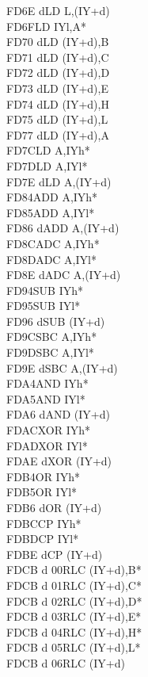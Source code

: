 \documentclass[oneside,a4paper]{book}
\begin{document}
\begin{multicols}{3}
{\begin{tabbing}
FD6E d\>LD L,(IY+d)\\
FD6F\>LD IYl,A*\\
FD70 d\>LD (IY+d),B\\
FD71 d\>LD (IY+d),C\\
FD72 d\>LD (IY+d),D\\
FD73 d\>LD (IY+d),E\\
FD74 d\>LD (IY+d),H\\
FD75 d\>LD (IY+d),L\\
FD77 d\>LD (IY+d),A\\
FD7C\>LD A,IYh*\\
FD7D\>LD A,IYl*\\
FD7E d\>LD A,(IY+d)\\
FD84\>ADD A,IYh*\\
FD85\>ADD A,IYl*\\
FD86 d\>ADD A,(IY+d)\\
FD8C\>ADC A,IYh*\\
FD8D\>ADC A,IYl*\\
FD8E d\>ADC A,(IY+d)\\
FD94\>SUB IYh*\\
FD95\>SUB IYl*\\
FD96 d\>SUB (IY+d)\\
FD9C\>SBC A,IYh*\\
FD9D\>SBC A,IYl*\\
FD9E d\>SBC A,(IY+d)\\
FDA4\>AND IYh*\\
FDA5\>AND IYl*\\
FDA6 d\>AND (IY+d)\\
FDAC\>XOR IYh*\\
FDAD\>XOR IYl*\\
FDAE d\>XOR (IY+d)\\
FDB4\>OR IYh*\\
FDB5\>OR IYl*\\
FDB6 d\>OR (IY+d)\\
FDBC\>CP IYh*\\
FDBD\>CP IYl*\\
FDBE d\>CP (IY+d)\\
FDCB d 00\>RLC (IY+d),B*\\
FDCB d 01\>RLC (IY+d),C*\\
FDCB d 02\>RLC (IY+d),D*\\
FDCB d 03\>RLC (IY+d),E*\\
FDCB d 04\>RLC (IY+d),H*\\
FDCB d 05\>RLC (IY+d),L*\\
FDCB d 06\>RLC (IY+d)\\

\end{tabbing}}
\end{multicols}
\end{document}
